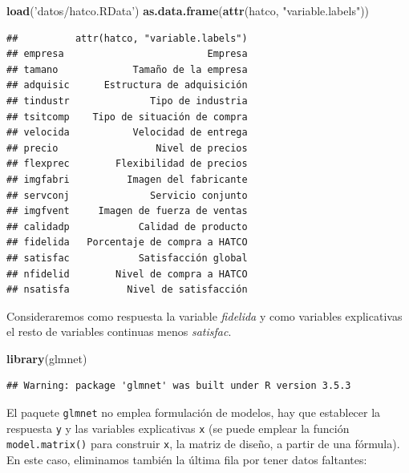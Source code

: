 \documentclass[]{book}
\newenvironment{Shaded}{\begin{snugshade}}{\end{snugshade}}
\newcommand{\KeywordTok}[1]{\textcolor[rgb]{0.13,0.29,0.53}{\textbf{#1}}}
\newcommand{\DecValTok}[1]{\textcolor[rgb]{0.00,0.00,0.81}{#1}}
\newcommand{\StringTok}[1]{\textcolor[rgb]{0.31,0.60,0.02}{#1}}
\newcommand{\OperatorTok}[1]{\textcolor[rgb]{0.81,0.36,0.00}{\textbf{#1}}}
\newcommand{\NormalTok}[1]{#1}
\begin{document}
\begin{Shaded}
\begin{Highlighting}[]
\KeywordTok{load}\NormalTok{(}\StringTok{'datos/hatco.RData'}\NormalTok{)}
\KeywordTok{as.data.frame}\NormalTok{(}\KeywordTok{attr}\NormalTok{(hatco, }\StringTok{"variable.labels"}\NormalTok{))}
\end{Highlighting}
\end{Shaded}

\begin{verbatim}
##          attr(hatco, "variable.labels")
## empresa                         Empresa
## tamano             Tamaño de la empresa
## adquisic      Estructura de adquisición
## tindustr              Tipo de industria
## tsitcomp    Tipo de situación de compra
## velocida           Velocidad de entrega
## precio                 Nivel de precios
## flexprec        Flexibilidad de precios
## imgfabri          Imagen del fabricante
## servconj              Servicio conjunto
## imgfvent     Imagen de fuerza de ventas
## calidadp            Calidad de producto
## fidelida   Porcentaje de compra a HATCO
## satisfac            Satisfacción global
## nfidelid        Nivel de compra a HATCO
## nsatisfa          Nivel de satisfacción
\end{verbatim}

Consideraremos como respuesta la variable \emph{fidelida} y como
variables explicativas el resto de variables continuas menos
\emph{satisfac}.

\begin{Shaded}
\begin{Highlighting}[]
\KeywordTok{library}\NormalTok{(glmnet)}
\end{Highlighting}
\end{Shaded}

\begin{verbatim}
## Warning: package 'glmnet' was built under R version 3.5.3
\end{verbatim}

El paquete \texttt{glmnet} no emplea formulación de modelos, hay que
establecer la respuesta \texttt{y} y las variables explicativas
\texttt{x} (se puede emplear la función \texttt{model.matrix()} para
construir \texttt{x}, la matriz de diseño, a partir de una fórmula). En
este caso, eliminamos también la última fila por tener datos faltantes:

\begin{Shaded}
\end{Shaded}
\end{document}
